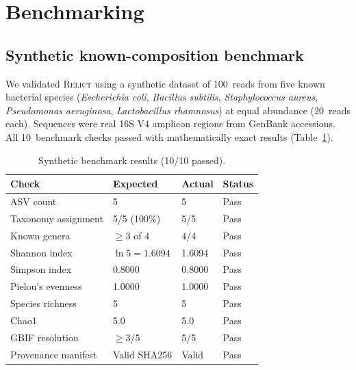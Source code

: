 \documentclass[11pt, a4paper]{article}
\newcommand{\relict}{\textsc{Relict}}
\begin{document}

\section{Benchmarking}

\subsection{Synthetic known-composition benchmark}

We validated \relict{} using a synthetic dataset of 100~reads from
five known bacterial species (\textit{Escherichia coli},
\textit{Bacillus subtilis}, \textit{Staphylococcus aureus},
\textit{Pseudomonas aeruginosa}, \textit{Lactobacillus rhamnosus})
at equal abundance (20~reads each). Sequences were real 16S V4
amplicon regions from GenBank accessions. All 10~benchmark checks
passed with mathematically exact results
(Table~\ref{tab:synthetic}).

\begin{table}[H]
    \centering
    \caption{Synthetic benchmark results (10/10 passed).}
    \label{tab:synthetic}
    \small
    \begin{tabular}{llll}
        \toprule
        \textbf{Check} & \textbf{Expected} & \textbf{Actual} &
        \textbf{Status} \\
        \midrule
        ASV count           & 5               & 5               & Pass \\
        Taxonomy assignment & 5/5 (100\%)     & 5/5             & Pass \\
        Known genera        & $\geq$3 of 4    & 4/4             & Pass \\
        Shannon index       & $\ln 5 = 1.6094$& 1.6094          & Pass \\
        Simpson index       & 0.8000          & 0.8000          & Pass \\
        Pielou's evenness   & 1.0000          & 1.0000          & Pass \\
        Species richness    & 5               & 5               & Pass \\
        Chao1               & 5.0             & 5.0             & Pass \\
        GBIF resolution     & $\geq$3/5       & 5/5             & Pass \\
        Provenance manifest & Valid SHA256     & Valid           & Pass \\
        \bottomrule
    \end{tabular}
\end{table}
\end{document}
